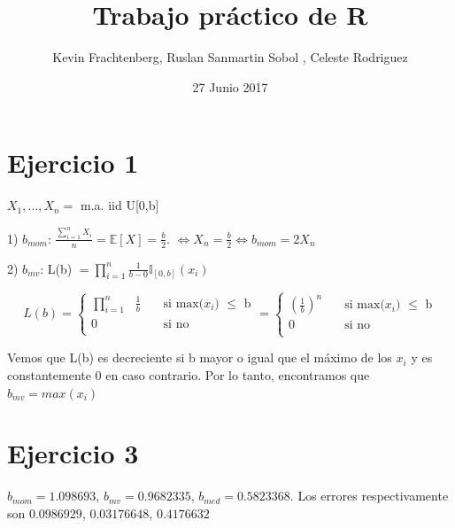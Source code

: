 \documentclass{article}
\title{Trabajo práctico de R}
\author{Kevin Frachtenberg, Ruslan Sanmartin Sobol , Celeste Rodriguez}
\date{27 Junio 2017}
\begin{document}
\maketitle

\section{Ejercicio 1}

$X_1,...,X_n =$ m.a. iid U[0,b]

1) $b_{mom}$: $\frac{\sum_{i=1}^{n} X_i}{n} = \mathbb{E}[X] = \frac{b}{2}$. $\Longleftrightarrow X_n = \frac{b}{2} \Longleftrightarrow b_{mom} = 2X_n$
\newline

2) $b_{mv}$: L(b) $= \prod_{i=1}^{n} \frac{1}{b-0} \mathds{I}_{[0,b]}(x_i)$


\[
L(b) = 
     \begin{cases}
       \text{$\prod_{i=1}^{n}$ $\frac{1}{b}$} &\quad\text{si max($x_i$) $\leq$ b}\\
       \text{0} &\quad\text{si no}\\ 
     \end{cases}
=
     \begin{cases}
       \text{$(\frac{1}{b})^n$} &\quad\text{si max($x_i$) $\leq$ b}\\
       \text{0} &\quad\text{si no}\\ 
     \end{cases}
\]

Vemos que L(b) es decreciente si b mayor o igual que el máximo de los $x_i$ y es constantemente 0 en caso contrario. Por lo tanto, encontramos que $b_{mv} = max(x_i)$

\newline

\section{Ejercicio 3} $b_{mom} = 1.098693$, $b_{mv} = 0.9682335$, $b_{med} = 0.5823368$. Los errores respectivamente son $0.0986929$, $0.03176648$, $0.4176632$
\end{document}
